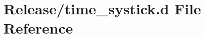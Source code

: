 \hypertarget{time__systick_8d}{}\section{Release/time\+\_\+systick.d File Reference}
\label{time__systick_8d}
